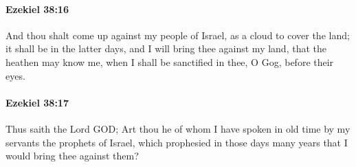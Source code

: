 		\paragraph{Ezekiel 38:16} %
			\label{EZEKIEL-38-16}

			And thou shalt come up against my people of Israel, as a cloud to cover the land; it shall be in the latter days, and I will bring thee against my land, that the heathen may know me, when I shall be sanctified in thee, O Gog, before their eyes.


		\paragraph{Ezekiel 38:17} %
			\label{EZEKIEL-38-17}

			Thus saith the Lord GOD; Art thou he of whom I have spoken in old time by my servants the prophets of Israel, which prophesied in those days many years that I would bring thee against them?

